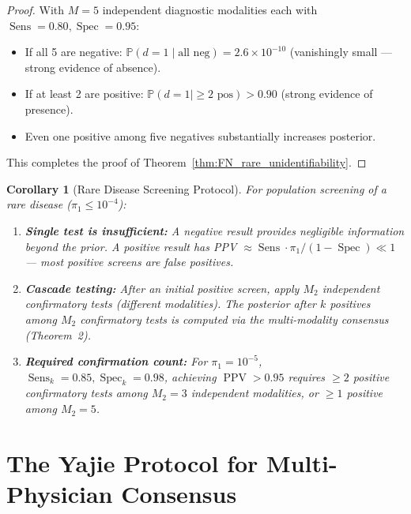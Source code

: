 \documentclass[11pt,a4paper]{article}
\newtheorem{corollary}[theorem]{Corollary}
\theoremstyle{definition}
\DeclareMathOperator{\Sens}{Sens}
\DeclareMathOperator{\Spec}{Spec}
\DeclareMathOperator{\PPV}{PPV}
\newcommand{\Pbb}{\mathbb{P}}
\newcommand{\disease}{d}                       %
\begin{document}
\begin{proof}
With $M=5$ independent diagnostic modalities each with $\Sens=0.80, \Spec=0.95$:
\begin{itemize}[nosep]
    \item If all 5 are negative: $\Pbb(\disease=1 \mid \text{all neg}) = 2.6 \times 10^{-10}$
    (vanishingly small --- strong evidence of absence).
    \item If at least 2 are positive: $\Pbb(\disease=1 \mid \ge 2 \text{ pos}) > 0.90$
    (strong evidence of presence).
    \item Even one positive among five negatives substantially increases posterior.
\end{itemize}

This completes the proof of Theorem~\ref{thm:FN_rare_unidentifiability}.
\end{proof}

\begin{corollary}[Rare Disease Screening Protocol]
\label{cor:rare_screening}
For population screening of a rare disease ($\pi_1 \le 10^{-4}$):
\begin{enumerate}[nosep]
    \item \textbf{Single test is insufficient:} A negative result provides
    negligible information beyond the prior. A positive result has
    PPV $\approx \Sens \cdot \pi_1 / (1-\Spec) \ll 1$ --- most positive
    screens are false positives.
    \item \textbf{Cascade testing:} After an initial positive screen, apply
    $M_2$ independent confirmatory tests (different modalities).
    The posterior after $k$ positives among $M_2$ confirmatory tests
    is computed via the multi-modality consensus (Theorem~2).
    \item \textbf{Required confirmation count:} For $\pi_1 = 10^{-5}$,
    $\Sens_k = 0.85, \Spec_k = 0.98$, achieving $\PPV > 0.95$ requires
    $\ge 2$ positive confirmatory tests among $M_2 = 3$ independent modalities,
    or $\ge 1$ positive among $M_2 = 5$.
\end{enumerate}
\end{corollary}

\section{The Yajie Protocol for Multi-Physician Consensus}
\label{sec:yajie}
\end{document}
